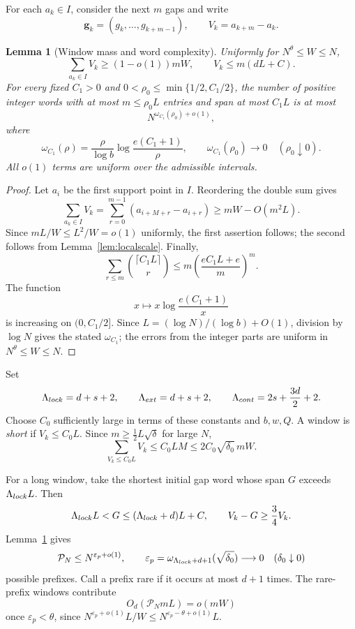\documentclass[10pt,a4paper]{amsart}
\newtheorem{lemma}[theorem]{Lemma}
\begin{document}
For each $a_k\in I$, consider the next $m$ gaps and write
\[
 \mathbf g_k=(g_k,\ldots,g_{k+m-1}),\qquad
 V_k=a_{k+m}-a_k.
\]

\begin{lemma}[Window mass and word complexity]\label{lem:windows}
Uniformly for $N^\theta\le W\le N$,
\[
 \sum_{a_k\in I}V_k\ge(1-o(1))mW,\qquad
 V_k\le m(dL+C).
\]
For every fixed $C_1>0$ and
$0<\rho_0\le\min\{1/2,C_1/2\}$, the number of positive integer
words with at most $m\le\rho_0L$ entries and span at most $C_1L$ is at most
\[
 N^{\omega_{C_1}(\rho_0)+o(1)},
\]
where
\[
 \omega_{C_1}(\rho)
 =\frac{\rho}{\log b}\log\frac{e(C_1+1)}{\rho},
 \qquad
 \omega_{C_1}(\rho_0)\longrightarrow0
 \quad(\rho_0\downarrow0).
\]
All $o(1)$ terms are uniform over the admissible intervals.
\end{lemma}

\begin{proof}
Let $a_i$ be the first support point in $I$. Reordering the double sum gives
\[
 \sum_{a_k\in I}V_k
 =\sum_{r=0}^{m-1}(a_{i+M+r}-a_{i+r})
 \ge mW-O(m^2L).
\]
Since $mL/W\le L^2/W=o(1)$ uniformly, the first assertion follows; the
second follows from Lemma~\ref{lem:localscale}. Finally,
\[
 \sum_{r\le m}\binom{\lceil C_1L\rceil}{r}
 \le m\left(\frac{eC_1L+e}{m}\right)^m.
\]
The function
\[
 x\longmapsto x\log\frac{e(C_1+1)}{x}
\]
is increasing on $(0,C_1/2]$. Since $L=(\log N)/(\log b)+O(1)$,
division by $\log N$ gives
the stated $\omega_{C_1}$; the errors from the integer parts are uniform in
$N^\theta\le W\le N$.
\end{proof}

Set
\[
 \Lambda_{\rm lock}=d+s+2,\qquad
 \Lambda_{\rm ext}=d+s+2,\qquad
 \Lambda_{\rm cont}=2s+\frac{3d}{2}+2.
\]
Choose $C_0$ sufficiently large in terms of these constants and $b,w,Q$.
A window is \emph{short} if $V_k\le C_0L$. Since
$m\ge\frac12L\sqrt\delta$ for large $N$,
\begin{equation}\label{eq:short}
 \sum_{V_k\le C_0L}V_k
 \le C_0LM
 \le2C_0\sqrt{\delta_0}\,mW.
\end{equation}

For a long window, take the shortest initial gap word whose span $G$ exceeds
$\Lambda_{\rm lock}L$. Then
\begin{equation}\label{eq:prefixspan}
 \Lambda_{\rm lock}L<G
 \le(\Lambda_{\rm lock}+d)L+C,\qquad
 V_k-G\ge\frac34V_k.
\end{equation}
Lemma~\ref{lem:windows} gives
\begin{equation}\label{eq:prefixcount}
 \mathcal P_N\le N^{\varepsilon_p+o(1)},\qquad
 \varepsilon_p
 =\omega_{\Lambda_{\rm lock}+d+1}(\sqrt{\delta_0})
 \longrightarrow0\quad(\delta_0\downarrow0)
\end{equation}
possible prefixes. Call a prefix rare if it occurs at most $d+1$ times.
The rare-prefix windows contribute
\begin{equation}\label{eq:rare}
 O_d(\mathcal P_NmL)=o(mW)
\end{equation}
once $\varepsilon_p<\theta$, since
$N^{\varepsilon_p+o(1)}L/W\le
N^{\varepsilon_p-\theta+o(1)}L$.
\end{document}
